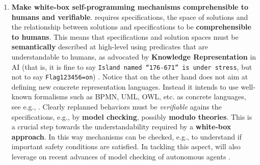 \begin{enumerate}

\item \textbf{Make white-box self-programming mechanisms comprehensible to
    humans and verifiable}. 
\project requires specifications, the space of solutions
  and the relationship between solutions and specifications to be
  \textbf{comprehensible to humans}.   
  This means that specifications and solution spaces must be
  \textbf{semantically} described at high-level using predicates that
  are understandable to humans, as advocated by \textbf{Knowledge
    Representation} in AI (that is, it is fine to say
  \texttt{Island named ``176-671'' is under stress}, but not to say \texttt{Flag123456=on})
  \cite{Baral10,EiterEFS10,BrewkaEP14,Shoham16,Levesque14,Levesque17}. Notice that on the other hand \project does not aim at defining new concrete representation languages. Instead it intends to use well-known formalisms such as BPMN, UML, OWL, etc. as concrete languages, see e.g., \cite{CAISE17}.
Clearly replanned behaviors
  must be  \emph{verifiable} agains the specifications, e.g., by \textbf{model checking},
  possibly \textbf{modulo theories}. %
  This is a crucial step towards the understandability required by a
  \textbf{white-box approach}.  In this way mechanisms can be checked, e.g.,  to understand if important safety conditions are
  satisfied. In tackling this aspect, \project will also leverage on
  recent advances of model checking of autonomous
  agents \cite{Wooldridge09,LomuscioQR17}.


\end{enumerate}
